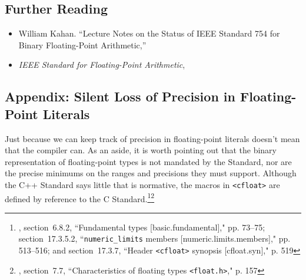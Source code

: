 \subsection[Further Reading]{Further Reading}\label{further-reading}

\begin{itemize}
\item{William Kahan. ``Lecture Notes on the Status of
IEEE Standard 754 for Binary Floating-Point Arithmetic,'' \cite{kahan97}}
\item{{\textit{IEEE Standard for Floating-Point Arithmetic}}, \cite{ieee19}}
\end{itemize} 

\subsection[Appendix: Silent Loss of Precision in Floating-Point Literals]{Appendix: Silent Loss of Precision in Floating-Point Literals}\label{appendix:-silent-loss-of-precision-in-floating-point-literals}

Just because we can keep track of precision in floating-point literals
doesn't mean that the compiler can. As an aside, it is worth
pointing out that the binary representation of floating-point types is
not mandated by the Standard, nor are the precise minimums on the ranges
and precisions they must support. Although the C++ Standard says little
that is normative, the macros in \lstinline!<cfloat>! are defined by
reference to the C Standard.\footnote{\cite{iso20b}, section~6.8.2, ``Fundamental types [basic.fundamental]," pp. 73--75; section~17.3.5.2, ``\texttt{numeric\_limits} members [numeric.limits.members]," pp. 513--516; and section~17.3.7, ``Header \texttt{<cfloat>} synopsis [cfloat.syn]," p. 519}\footnote{\cite{iso18b}, section~7.7,  
``Characteristics of floating types \texttt{<float.h>}," p. 157}

